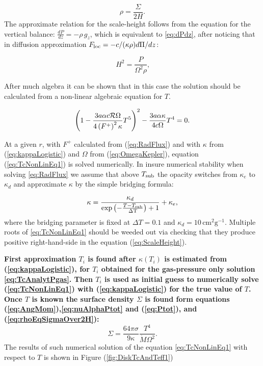 \documentclass[12pt,english,preprint]{aastex}
\newcommand{\mybf}{\bf}
\newcommand{\su}[2]{#1_{\rm #2}}
\newcommand{\Tc}{T}
\begin{document}
\begin{equation}
{\displaystyle \rho=\frac{\Sigma}{2H}}\label{eq:rhoEqSigmaOver2H}\mbox{.}
\end{equation}
The approximate relation for the scale-height follows from
the equation for the vertical balance:
$\displaystyle \frac{dP}{dz}=-\rho\,g_{z}$,
which is equivalent to \eqref{eq:dPdz}, after noticing that in diffusion approximation 
$\displaystyle \su{F}{loc}=-c/(\kappa\rho)d\Pi/dz$:

  
\begin{equation}
{\displaystyle H^{2}=\frac{P}{\Omega^{2}\rho}\mbox{,}}\label{eq:ScaleHeight}
\end{equation}

After much algebra it can be shown that in this case the solution should be calculated from 
a non-linear algebraic equation for $\Tc$.

\begin{equation}
\left(1-\frac{3a\alpha c{\cal R}\Omega}{4\left(F^{+}\right)^{2}\kappa}
\Tc^{5}\right)^{2}-\frac{3a\alpha\kappa}{4c\Omega}\Tc^{4}=0\mbox{.}
\label{eq:TcNonLinEq1}
\end{equation}

At a given $r$, with $F^{+}$ calculated from (\ref{eq:RadFlux})
and with $\kappa$ from (\ref{eq:kappaLogistic}) and $\Omega$ from
(\ref{eq:OmegaKepler}), equation (\ref{eq:TcNonLinEq1}) is solved
numerically. 
In insure numerical stability when solving \eqref{eq:RadFlux}
we assume that above $T_{{\rm sub}}$ the opacity switches from $\kappa_{e}$ to
$\kappa_{d}$  and approximate $\kappa$ by the simple bridging formula:

\begin{equation}
\kappa=\frac{\text{\ensuremath{\kappa_{d}}}}
{\exp\left(-\frac{T-T_{{\rm sub}}}
{\text{\ensuremath{\Delta}T}}\right)+1}+\text{\ensuremath{\kappa_{e}\mbox{,}}}\label{eq:kappaLogistic}
\end{equation}
where the bridging parameter is fixed at $\Delta T=0.1$ and $\kappa_{d}=10\,\text{cm}^{2}\text{g}^{-1}$.
Multiple roots of \eqref{eq:TcNonLinEq1} should be weeded out via checking that
they produce positive right-hand-side in the equation (\ref{eq:ScaleHeight}).

{\mybf
First approximation $T_i$
is found after $\kappa(T_i)$ is estimated from (\ref{eq:kappaLogistic}), 
for $T_i$ obtained
for the gas-pressure only solution \eqref{eq:TcAnalytPgas}.
Then $T_i$ is used as initial guess to numerically 
solve (\ref{eq:TcNonLinEq1}) with (\ref{eq:kappaLogistic}) 
for the true value of $T$.
Once $\Tc$ is known the surface
density $\Sigma$ is found form equations 
(\ref{eq:AngMom}),\eqref{eq:nuAlphaPtot} and (\ref{eq:Ptot}),
and (\ref{eq:rhoEqSigmaOver2H}):
}
\begin{equation}
\Sigma=\frac{64\pi\sigma}{9 \kappa} 
\frac{\Tc^{4}}{\dot{M}\Omega^{2}}
\mbox{.}\label{eq:SigmaSolArbP}
\end{equation}
The results of such numerical solution of the equation 
\eqref{eq:TcNonLinEq1}
with respect to $\Tc$ is shown in 
Figure (\ref{fig:DiskTcAndTeff1})
\end{document}
